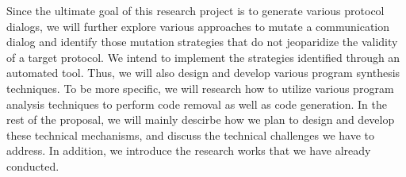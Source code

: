 Since the ultimate goal of this research project is to generate various protocol
dialogs, we will further explore various approaches to mutate a communication
dialog and identify those mutation strategies that do not jeoparidize the
validity of a target protocol. We intend to implement the strategies  identified
through an automated tool. Thus, we will also design and develop various program
synthesis techniques. To be more specific, we will research how to utilize
various program analysis techniques to perform code removal as well as code
generation. In the rest of the proposal, we will mainly descirbe how we plan to
design and develop these technical mechanisms, and discuss the technical
challenges we have to address. In addition, we introduce the research works that
we have already conducted.












